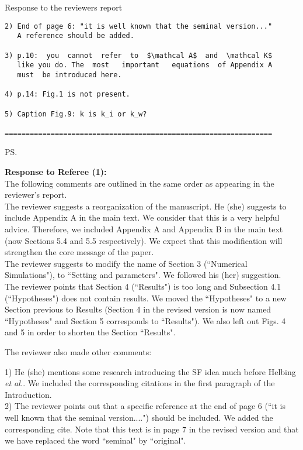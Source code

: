 \documentclass[a4paper,12pt]{letter}
\begin{document}
\begin{letter}{Response to the reviewers report}
\begin{verbatim}
2) End of page 6: "it is well known that the seminal version..."
   A reference should be added.

3) p.10:  you  cannot  refer  to  $\mathcal A$  and  \mathcal K$ 
   like you do. The  most   important   equations  of Appendix A 
   must  be introduced here.

4) p.14: Fig.1 is not present.

5) Caption Fig.9: k is k_i or k_w?

================================================================
\end{verbatim}


\ps{\textbf{Response to Referee (1):}
\\ 

The following comments are outlined in the same order as appearing in the
reviewer’s report. \\

The reviewer suggests a reorganization of the manuscript. He (she) suggests to include Appendix A in the main text.
We consider that this is a very helpful advice. Therefore, we included Appendix A and Appendix B in the main text (now Sections 5.4 and 5.5 respectively). 
We expect that this modification will strengthen the core message of the paper. \\ 

The reviewer suggests to modify the name of Section 3 (``Numerical Simulations"), to ``Setting and parameters". We followed his (her) suggestion. \\

The reviewer points that Section 4 (``Results") is too long and Subsection 4.1 (``Hypotheses")
does not contain results.  We moved the ``Hypotheses" to a new Section previous to Results 
(Section 4 in the revised version is now named ``Hypotheses" and Section 5 corresponds to ``Results"). We also left out Figs. 4 and 5 in order to shorten the Section ``Results". 

The reviewer also made other comments:

1) He (she) mentions some research introducing the SF idea much before 
Helbing \textit{et al.}. We included the corresponding citations 
in the first paragraph of the Introduction. \\


2) The reviewer points out that a specific reference at the end of 
page 6 (``it is well known that the seminal version....") should be included. 
We added the corresponding cite. Note that this text is in page 7 in the revised version and that we have replaced the word ``seminal" by ``original".   \\


}
\end{letter}
\end{document}
